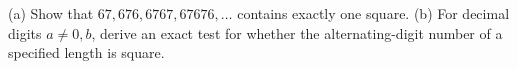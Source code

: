 (a) Show that $67,676,6767,67676,\ldots$ contains exactly one square. (b) For decimal digits $a\ne0,b$, derive an exact test for whether the alternating-digit number of a specified length is square.
